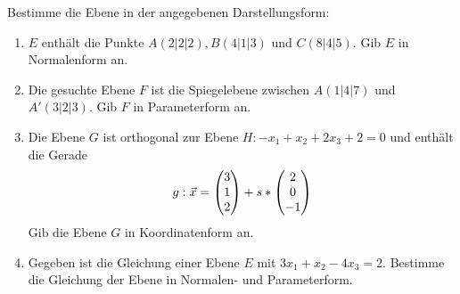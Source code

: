 Bestimme die Ebene in der angegebenen Darstellungsform:
\begin{enumerate}
	\item $E$ enthält die Punkte $A(2|2|2), B(4|1|3)$ und $C(8|4|5)$. Gib $E$ in Normalenform an. %
	\item Die gesuchte Ebene $F$ ist die Spiegelebene zwischen $A(1|4|7)$ und $A'(3|2|3)$. Gib $F$ in Parameterform an. %
	\item Die Ebene $G$ ist orthogonal zur Ebene $H:-x_1+x_2+2x_3+2=0$ und enthält die Gerade
	\begin{equation*}
		g: \vec x = \begin{pmatrix} 3\\1\\2 \end{pmatrix}+s*\begin{pmatrix} 2\\0\\-1 \end{pmatrix}
	\end{equation*}
	Gib die Ebene $G$ in Koordinatenform an. %
	\item Gegeben ist die Gleichung einer Ebene $E$ mit $3x_1+x_2-4x_3=2$. Bestimme die Gleichung der Ebene in Normalen- und Parameterform.
\end{enumerate}
